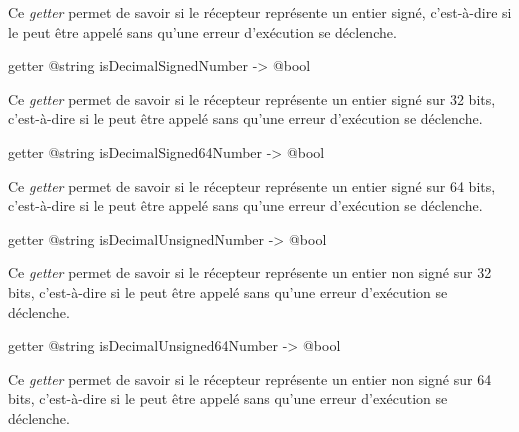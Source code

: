 Ce \emph{getter} permet de savoir si le récepteur représente un entier signé, c'est-à-dire si le  peut être appelé sans qu'une erreur d'exécution se déclenche.







\begin{galgasbox}
getter @string isDecimalSignedNumber -> @bool
\end{galgasbox}

Ce \emph{getter} permet de savoir si le récepteur représente un entier signé sur 32 bits, c'est-à-dire si le  peut être appelé sans qu'une erreur d'exécution se déclenche.







\begin{galgasbox}
getter @string isDecimalSigned64Number -> @bool
\end{galgasbox}

Ce \emph{getter} permet de savoir si le récepteur représente un entier signé sur 64 bits, c'est-à-dire si le  peut être appelé sans qu'une erreur d'exécution se déclenche.







\begin{galgasbox}
getter @string isDecimalUnsignedNumber -> @bool
\end{galgasbox}

Ce \emph{getter} permet de savoir si le récepteur représente un entier non signé sur 32 bits, c'est-à-dire si le  peut être appelé sans qu'une erreur d'exécution se déclenche.







\begin{galgasbox}
getter @string isDecimalUnsigned64Number -> @bool
\end{galgasbox}

Ce \emph{getter} permet de savoir si le récepteur représente un entier non signé sur 64 bits, c'est-à-dire si le  peut être appelé sans qu'une erreur d'exécution se déclenche.






